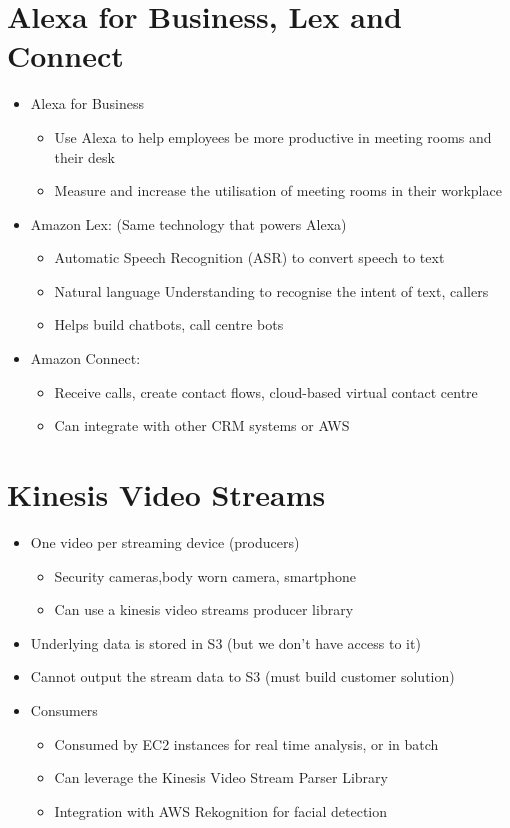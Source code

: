 \section{Alexa for Business, Lex and Connect}
\begin{itemize}
    \item Alexa for Business
    \begin{itemize}
        \item Use Alexa to help employees be more productive in meeting rooms and their desk
        \item Measure and increase the utilisation of meeting rooms in their workplace
    \end{itemize}
    \item Amazon Lex: (Same technology that powers Alexa)
    \begin{itemize}
        \item Automatic Speech Recognition (ASR) to convert speech to text
        \item Natural language Understanding to recognise the intent of text, callers
        \item Helps build chatbots, call centre bots
    \end{itemize}
    \item Amazon Connect:
    \begin{itemize}
        \item Receive calls, create contact flows, cloud-based virtual contact centre
        \item Can integrate with other CRM systems or AWS
    \end{itemize}
\end{itemize}


\section{Kinesis Video Streams}
\begin{itemize}
    \item One video per streaming device (producers)
    \begin{itemize}
        \item Security cameras,body worn camera, smartphone
        \item Can use a kinesis video streams producer library
    \end{itemize}
    \item Underlying data is stored in S3 (but we don't have access to it)
    \item Cannot output the stream data to S3 (must build customer solution)
    \item Consumers
    \begin{itemize}
        \item Consumed by EC2 instances for real time analysis, or in batch
        \item Can leverage the Kinesis Video Stream Parser Library
        \item Integration with AWS Rekognition for facial detection
    \end{itemize}
\end{itemize}

